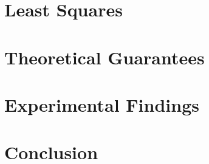 \documentclass[12pt, oneside]{amsart}
\theoremstyle{definition}
\theoremstyle{remark}
\numberwithin{equation}{section}
\begin{document}
\section{Least Squares}


\section{Theoretical Guarantees}


\section{Experimental Findings}


\section{Conclusion}


\newpage
\end{document}
